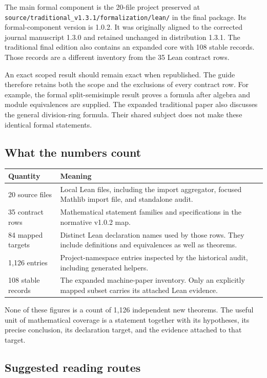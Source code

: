 \documentclass[11pt,a4paper]{article}
\newcommand{\code}[1]{\nolinkurl{#1}}
\begin{document}
The main formal component is the 20-file project preserved at \code{source/traditional_v1.3.1/formalization/lean/} in the final package. Its formal-component version is 1.0.2. It was originally aligned to the corrected journal manuscript 1.3.0 and retained unchanged in distribution 1.3.1. The traditional final edition also contains an expanded core with 108 stable records. Those records are a different inventory from the 35 Lean contract rows.

An exact scoped result should remain exact when republished. The guide therefore retains both the scope and the exclusions of every contract row. For example, the formal split-semisimple result proves a formula after algebra and module equivalences are supplied. The expanded traditional paper also discusses the general division-ring formula. Their shared subject does not make these identical formal statements.

\subsection{What the numbers count}

\begin{tabular}{p{}p{}}
\toprule Quantity & Meaning \\\midrule
20 source files & Local Lean files, including the import aggregator, focused Mathlib import file, and standalone audit. \\
35 contract rows & Mathematical statement families and specifications in the normative v1.0.2 map. \\
84 mapped targets & Distinct Lean declaration names used by those rows. They include definitions and equivalences as well as theorems. \\
1,126 entries & Project-namespace entries inspected by the historical audit, including generated helpers. \\
108 stable records & The expanded machine-paper inventory. Only an explicitly mapped subset carries its attached Lean evidence. \\
\bottomrule
\end{tabular}

None of these figures is a count of 1,126 independent new theorems. The useful unit of mathematical coverage is a statement together with its hypotheses, its precise conclusion, its declaration target, and the evidence attached to that target.

\subsection{Suggested reading routes}
\end{document}
